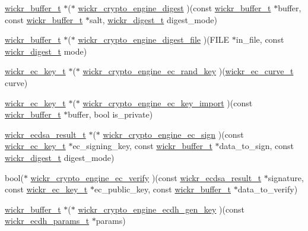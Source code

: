 \begin{DoxyCompactItemize}
\item 
\hyperlink{structwickr__buffer}{wickr\+\_\+buffer\+\_\+t} $\ast$($\ast$ \hyperlink{group__wickr__crypto__engine_ga42dfc5b4df166616d962ee4c792ceaf4}{wickr\+\_\+crypto\+\_\+engine\+\_\+digest} )(const \hyperlink{structwickr__buffer}{wickr\+\_\+buffer\+\_\+t} $\ast$buffer, const \hyperlink{structwickr__buffer}{wickr\+\_\+buffer\+\_\+t} $\ast$salt, \hyperlink{structwickr__digest}{wickr\+\_\+digest\+\_\+t} digest\+\_\+mode)
\item 
\hyperlink{structwickr__buffer}{wickr\+\_\+buffer\+\_\+t} $\ast$($\ast$ \hyperlink{group__wickr__crypto__engine_ga298d2dea6722151c11e04458d3924823}{wickr\+\_\+crypto\+\_\+engine\+\_\+digest\+\_\+file} )(F\+I\+LE $\ast$in\+\_\+file, const \hyperlink{structwickr__digest}{wickr\+\_\+digest\+\_\+t} mode)
\item 
\hyperlink{structwickr__ec__key}{wickr\+\_\+ec\+\_\+key\+\_\+t} $\ast$($\ast$ \hyperlink{group__wickr__crypto__engine_gad16b229b7d16cf00d3983c277ee3b88b}{wickr\+\_\+crypto\+\_\+engine\+\_\+ec\+\_\+rand\+\_\+key} )(\hyperlink{structwickr__ec__curve}{wickr\+\_\+ec\+\_\+curve\+\_\+t} curve)
\item 
\hyperlink{structwickr__ec__key}{wickr\+\_\+ec\+\_\+key\+\_\+t} $\ast$($\ast$ \hyperlink{group__wickr__crypto__engine_ga87a069bbd3cdf509946e4ca0ca008f8f}{wickr\+\_\+crypto\+\_\+engine\+\_\+ec\+\_\+key\+\_\+import} )(const \hyperlink{structwickr__buffer}{wickr\+\_\+buffer\+\_\+t} $\ast$buffer, bool is\+\_\+private)
\item 
\hyperlink{structwickr__ecdsa__result}{wickr\+\_\+ecdsa\+\_\+result\+\_\+t} $\ast$($\ast$ \hyperlink{group__wickr__crypto__engine_gac5a36d2a53e06a75a2b818e6a5cc96a1}{wickr\+\_\+crypto\+\_\+engine\+\_\+ec\+\_\+sign} )(const \hyperlink{structwickr__ec__key}{wickr\+\_\+ec\+\_\+key\+\_\+t} $\ast$ec\+\_\+signing\+\_\+key, const \hyperlink{structwickr__buffer}{wickr\+\_\+buffer\+\_\+t} $\ast$data\+\_\+to\+\_\+sign, const \hyperlink{structwickr__digest}{wickr\+\_\+digest\+\_\+t} digest\+\_\+mode)
\item 
bool($\ast$ \hyperlink{group__wickr__crypto__engine_gae541acc6433f6f5ffe84382ccd5e4f97}{wickr\+\_\+crypto\+\_\+engine\+\_\+ec\+\_\+verify} )(const \hyperlink{structwickr__ecdsa__result}{wickr\+\_\+ecdsa\+\_\+result\+\_\+t} $\ast$signature, const \hyperlink{structwickr__ec__key}{wickr\+\_\+ec\+\_\+key\+\_\+t} $\ast$ec\+\_\+public\+\_\+key, const \hyperlink{structwickr__buffer}{wickr\+\_\+buffer\+\_\+t} $\ast$data\+\_\+to\+\_\+verify)
\item 
\hyperlink{structwickr__buffer}{wickr\+\_\+buffer\+\_\+t} $\ast$($\ast$ \hyperlink{group__wickr__crypto__engine_ga94bdc8d3b88ac04b9defe663afa48e78}{wickr\+\_\+crypto\+\_\+engine\+\_\+ecdh\+\_\+gen\+\_\+key} )(const \hyperlink{structwickr__ecdh__params}{wickr\+\_\+ecdh\+\_\+params\+\_\+t} $\ast$params)

\end{DoxyCompactItemize}
